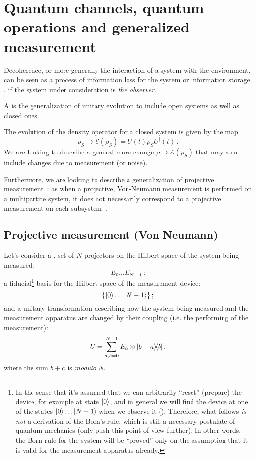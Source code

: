 \section[Channels, operations and generalized measurement]
  {Quantum channels, quantum operations and generalized measurement}

Decoherence,
or more generally the interaction of a system with the environment,
can be seen as a process of information loss for the system
\parencite[Ch. 9]{Nakahara} or information storage
\parencite{Zurek_Einselect}, if the system under consideration
is \emph{the observer}.

A  \parencite[Ch. 9]{Nakahara} is the generalization
of unitary evolution to include open systems as well as closed ones.

The evolution of the density operator for a closed system is given by the map
\[
    \rho_{S} \rightarrow \mathcal{E}(\rho_{S}) = U(t)\rho_{S}U^{\dagger}(t) \, \text{.}
\] 
We are looking to describe a general more change
$\rho \rightarrow \mathcal{E}(\rho_{S})$ that may also include
changes due to measurement (or noise).

Furthermore, we are looking to describe a generalization
of projective measurement~\parencite{VonNeumann}:
as when a projective, Von-Neumann
measurement is performed on a multipartite system,
it does not necessarily correspond to a projective measurement
on each subsystem~\parencite[Ch. 3]{PreskillNotes}.

\subsection{Projective measurement (Von Neumann)}

Let's consider a ,  set of $N$ projectors
on the Hilbert space
of the system being measured:
\[
  E_0 \dots E_{N-1} \,\text{;}
\]
a fiducial\footnote{
  In the sense that it's assumed
  that we can arbitrarily ``reset'' (prepare) the device,
  for example at state $\ket{0}$,
  and in general
  we will find the device at one of the states
  $\ket{0}\dots\ket{N-1}$
  when we observe it ().
  Therefore, what follows \emph{is not} a derivation of the Born's rule,
  which is still a necessary postulate of quantum mechanics
  (only \cite{Zurek_Decoherence, Zurek_Einselect, Zurek_Fundamentals} push
  this point of view further). In other words, the Born rule for the system
  will be ``proved''
  only on the assumption that it is valid for the measurement apparatus already.
}
basis for the Hilbert space of the measurement device:
\[
  \left\{\ket{0} \dots \ket{N-1}\right\} \text{;}
\]
and a unitary transformation describing how the
system being measured and the measurement apparatus
are changed by their coupling (i.e. the performing of the measurement):
\begin{equation}\label{eq:unitary_measurement}
  U = \sum_{a, b = 0}^{N-1} E_a \otimes \ketbra{b+a}{b} \text{,}
\end{equation}
where the sum $b+a$ is \emph{modulo N}.

